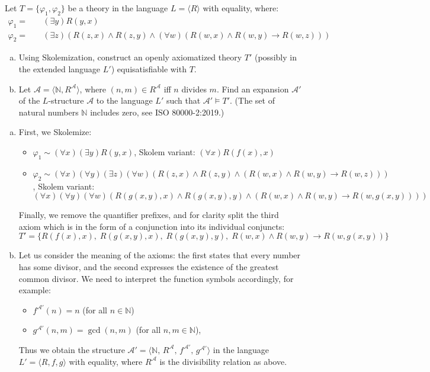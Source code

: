 \begin{problem}

    Let $T=\{\varphi_1,\varphi_2\}$ be a theory in the language $L=\langle R\rangle$ with equality, where:
    \begin{align*}
    \varphi_1=&\quad (\exists y)R(y,x)\\
    \varphi_2=&\quad (\exists z)(R(z,x)\wedge R(z,y)\wedge (\forall w)(R(w,x) \wedge R(w,y)\to R(w,z)))
    \end{align*}
    \begin{enumerate}[(a)]
        \item Using Skolemization, construct an openly axiomatized theory $T'$ (possibly in the extended language $L'$) equisatisfiable with $T$.
        \item Let $\mathcal{A}=\langle\mathbb{N},R^{\mathcal A}\rangle$, where $(n,m)\in R^{\mathcal A}$ iff $n$ divides $m$. Find an expansion $\mathcal{A}'$ of the $L$-structure $\mathcal{A}$ to the language $L'$ such that $\mathcal{A}'\models T'$. (The set of natural numbers $\mathbb N$ includes zero, see ISO 80000-2:2019.)
    \end{enumerate}

    \begin{solution}
        \begin{enumerate}[(a)]
            \item First, we Skolemize:
            \begin{itemize}
                \item $\varphi_1\sim (\forall x)(\exists y)R(y,x)$, Skolem variant: 
                $(\forall x)R(f(x),x)$
                \item $\varphi_2\sim (\forall x)(\forall y)(\exists z)(\forall w)(R(z,x)\wedge R(z,y)\wedge (R(w,x) \wedge R(w,y)\to R(w,z)))$, Skolem variant: 
                $$
                (\forall x)(\forall y)(\forall w)(R(g(x,y),x)\wedge R(g(x,y),y)\wedge (R(w,x)\wedge R(w,y)\to R(w,g(x,y))))
                $$
            \end{itemize}
            Finally, we remove the quantifier prefixes, and for clarity split the third axiom which is in the form of a conjunction into its individual conjuncts:
            $$
            T'=\{R(f(x),x),\; R(g(x,y),x),\; R(g(x,y),y),\; R(w,x)\wedge R(w,y)\to R(w,g(x,y))\}
            $$
            \item Let us consider the meaning of the axioms: the first states that every number has some divisor, and the second expresses the existence of the greatest common divisor. We need to interpret the function symbols accordingly, for example:
            \begin{itemize}
                \item $f^{\mathcal A'}(n)=n$ (for all $n\in\mathbb N$)
                \item $g^{\mathcal A'}(n,m)=\gcd(n,m)$ (for all $n,m\in\mathbb N$),
            \end{itemize}
            Thus we obtain the structure $\mathcal A'=\langle\mathbb N,\,R^{\mathcal A},\,f^{\mathcal A'},\,g^{\mathcal A'}\rangle$ in the language $L'=\langle R,f,g\rangle$ with equality, where $R^{\mathcal A}$ is the divisibility relation as above.


\end{enumerate}
\end{solution}
\end{problem}

